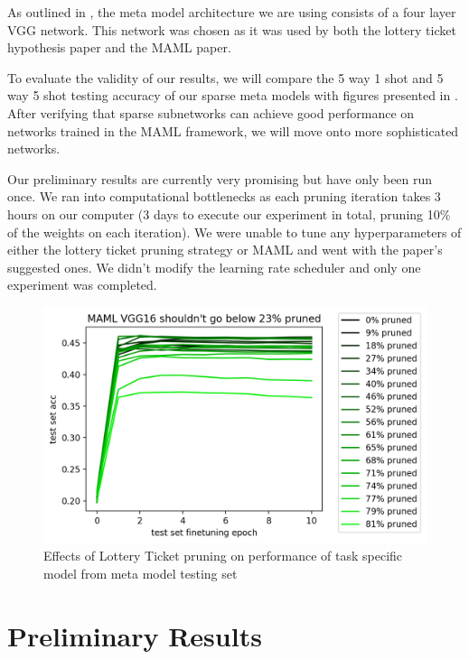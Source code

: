 \documentclass[twocolumn, 10pt]{article}
\begin{document}
As outlined in \cite{finn2017modelagnostic}, the meta model architecture we are using consists of a four layer VGG network. This network was chosen as it was used by both the lottery ticket hypothesis paper and the MAML paper. 

To evaluate the validity of our results, we will compare the 5 way 1 shot and 5 way 5 shot testing accuracy of our sparse meta models with figures presented in \cite{finn2017modelagnostic}. After verifying that sparse subnetworks can achieve good performance on networks trained in the MAML framework, we will move onto more sophisticated networks.

Our preliminary results are currently very promising but have only been run once. We ran into computational bottlenecks as each pruning iteration takes 3 hours on our computer (3 days to execute our experiment in total, pruning 10\% of the weights on each iteration). We were unable to tune any hyperparameters of either the lottery ticket pruning strategy or MAML and went with the paper's suggested ones. We didn't modify the learning rate scheduler and only one experiment was completed.

\begin{figure}
\includegraphics[scale=.4]{repeated_pruning.png}
\caption{Effects of Lottery Ticket pruning on performance of task specific model from meta model testing set}
\label{lth_vgg}
\end{figure}

\section{Preliminary Results}
\end{document}
